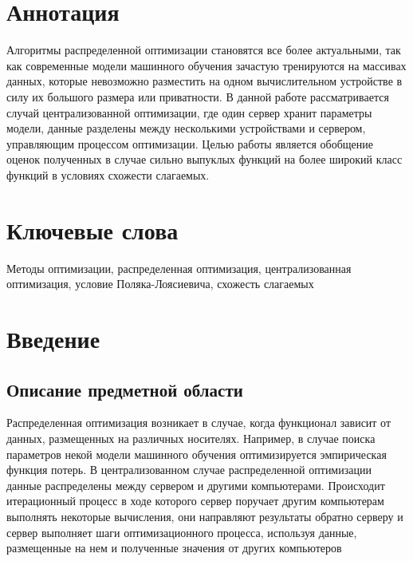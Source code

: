 \documentclass[a4paper,12pt]{extarticle}
\begin{document}
\newpage
\setcounter{page}{2}

{   

	\hypersetup{linkcolor=black}
	\tableofcontents
}

\newpage

\newpage
\section*{Аннотация}   %

Алгоритмы распределенной оптимизации становятся все более актуальными,
так как современные модели машинного обучения зачастую тренируются на массивах данных,
которые невозможно разместить на одном вычислительном устройстве в силу их большого размера или приватности.
В данной работе рассматривается случай централизованной оптимизации, где один сервер хранит параметры модели,
данные разделены между несколькими устройствами и сервером, управляющим процессом оптимизации.
Целью работы является обобщение оценок полученных в случае сильно выпуклых функций на более широкий класс функций
в условиях схожести слагаемых. 
\section*{Ключевые слова}
Методы оптимизации, распределенная оптимизация, централизованная оптимизация, условие Поляка-Лоясиевича, схожесть слагаемых
\pagebreak



\section{Введение}

\subsection{Описание предметной области}
\newcommand{\zij}{z_{i}^{(j)}}
\newcommand{\lxz}{l (x, \zij)}
\newcommand{\fj}{\sum_{i=1}^{n} \lxz}
\newcommand{\R}{\mathbb{R}}

Распределенная оптимизация возникает в случае, когда функционал зависит от данных, размещенных на различных носителях.
Например, в случае поиска параметров некой модели машинного обучения оптимизируется эмпирическая функция потерь.
В централизованном случае распределенной оптимизации данные распределены между сервером и другими компьютерами.
Происходит итерационный процесс в ходе которого сервер поручает другим компьютерам выполнять некоторые вычисления,
они направляют результаты обратно серверу и сервер выполняет шаги оптимизационного процесса, используя данные,
размещенные на нем и полученные значения от других компьютеров
\end{document}
